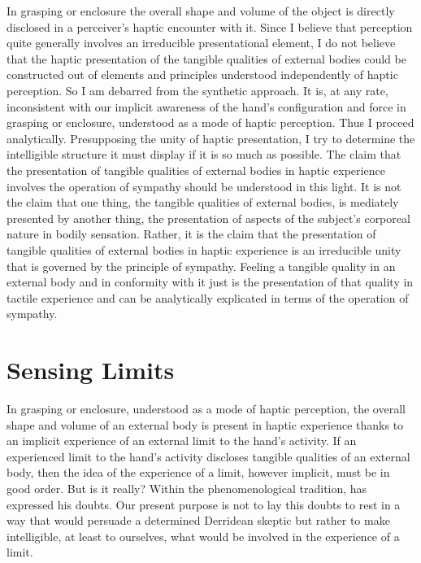 In grasping or enclosure the overall shape and volume of the object is directly disclosed in a perceiver's haptic encounter with it. Since I believe that perception quite generally involves an irreducible presentational element, I do not believe that the haptic presentation of the tangible qualities of external bodies could be constructed out of elements and principles understood independently of haptic perception. So I am debarred from the synthetic approach. It is, at any rate, inconsistent with our implicit awareness of the hand's configuration and force in grasping or enclosure, understood as a mode of haptic perception. Thus I proceed analytically. Presupposing the unity of haptic presentation, I try to determine the intelligible structure it must display if it is so much as possible. The claim that the presentation of tangible qualities of external bodies in haptic experience involves the operation of sympathy should be understood in this light. It is not the claim that one thing, the tangible qualities of external bodies, is mediately presented by another thing, the presentation of aspects of the subject's corporeal nature in bodily sensation. Rather, it is the claim that the presentation of tangible qualities of external bodies in haptic experience is an irreducible unity that is governed by the principle of sympathy. Feeling a tangible quality in an external body and in conformity with it just is the presentation of that quality in tactile experience and can be analytically explicated in terms of the operation of sympathy.


\section{Sensing Limits} %
\label{sec:sensing_limits}

In grasping or enclosure, understood as a mode of haptic perception, the overall shape and volume of an external body is present in haptic experience thanks to an implicit experience of an external limit to the hand's activity. If an experienced limit to the hand's activity discloses tangible qualities of an external body, then the idea of the experience of a limit, however implicit, must be in good order. But is it really? Within the phenomenological tradition, \citet{Derrida:2005aa} has expressed his doubts. Our present purpose is not to lay this doubts to rest in a way that would persuade a determined Derridean skeptic but rather to make intelligible, at least to ourselves, what would be involved in the experience of a limit.

